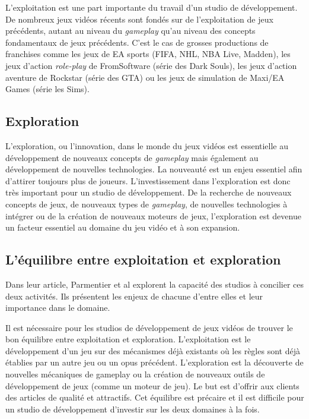 L'exploitation est une part importante du travail d'un studio de développement. De nombreux jeux vidéos récents sont fondés sur de l'exploitation de jeux précédents, autant au niveau du \emph{gameplay} qu'au niveau des concepts fondamentaux de jeux précédents. C'est le cas de grosses productions de franchises comme les jeux de EA sports (FIFA, NHL, NBA Live, Madden), les jeux d'action \emph{role-play} de FromSoftware (série des Dark Souls), les jeux d'action aventure de Rockstar (série des GTA) ou les jeux de simulation de Maxi/EA Games (série les Sims). 

\subsection{Exploration}
L'exploration, ou l'innovation, dans le monde du jeux vidéos est essentielle au développement de nouveaux concepts de \emph{gameplay} mais également au développement de nouvelles technologies. La nouveauté est un enjeu essentiel afin d'attirer toujours plus de joueurs. L'investissement dans l'exploration est donc très important pour un studio de développement. De la recherche de nouveaux concepts de jeux, de nouveaux types de \emph{gameplay}, de nouvelles technologies à intégrer ou de la création de nouveaux moteurs de jeux, l'exploration est devenue un facteur essentiel au domaine du jeu vidéo et à son expansion.


\subsection{L'équilibre entre exploitation et exploration}
Dans leur article, Parmentier et al \cite{ParmentierGuy2009Iecd} explorent la capacité des studios à concilier ces deux activités. Ils présentent les enjeux de chacune d'entre elles et leur importance dans le domaine.

Il est nécessaire pour les studios de développement de jeux vidéos de trouver le bon équilibre entre exploitation et exploration. L'exploitation est le développement d'un jeu sur des mécanismes déjà existants où les règles sont déjà établies par un autre jeu ou un opus précédent. L'exploration est la découverte de nouvelles mécaniques de gameplay ou la création de nouveaux outils de développement de jeux (comme un moteur de jeu). Le but est d'offrir aux clients des articles de qualité et attractifs. Cet équilibre est précaire et il est difficile pour un studio de développement d'investir sur les deux domaines à la fois. 



